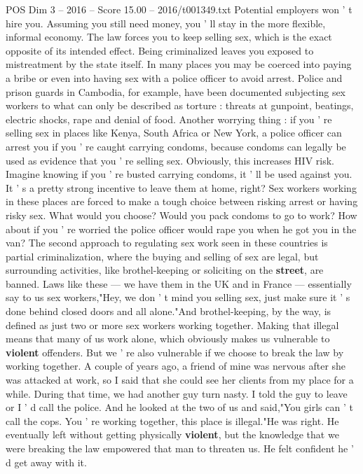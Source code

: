 \begin{textsample}{POS Dim 3 – 2016 – Score 15.00 – 2016/t001349.txt}
Potential employers won ' t hire you.
Assuming you still need money, you ' ll stay in the more flexible, informal economy.
The law forces you to keep selling sex, which is the exact opposite of its intended effect.
Being criminalized leaves you exposed to mistreatment by the state itself.
In many places you may be coerced into paying a bribe or even into having sex with a police officer to avoid arrest.
Police and prison guards in Cambodia, for example, have been documented subjecting sex workers to what can only be described as torture : threats at gunpoint, beatings, electric shocks, rape and denial of food.
Another worrying thing : if you ' re selling sex in places like Kenya, South Africa or New York, a police officer can arrest you if you ' re caught carrying condoms, because condoms can legally be used as evidence that you ' re selling sex.
Obviously, this increases HIV risk.
Imagine knowing if you ' re busted carrying condoms, it ' ll be used against you.
It ' s a pretty strong incentive to leave them at home, right?
Sex workers working in these places are forced to make a tough choice between risking arrest or having risky sex.
What would you choose?
Would you pack condoms to go to work?
How about if you ' re worried the police officer would rape you when he got you in the van?
The second approach to regulating sex work seen in these countries is partial criminalization, where the buying and selling of sex are legal, but surrounding activities, like brothel-keeping or soliciting on the \textbf{street}, are banned.
Laws like these — we have them in the UK and in France — essentially say to us sex workers,"Hey, we don ' t mind you selling sex, just make sure it ' s done behind closed doors and all alone."And brothel-keeping, by the way, is defined as just two or more sex workers working together.
Making that illegal means that many of us work alone, which obviously makes us vulnerable to \textbf{violent} offenders.
But we ' re also vulnerable if we choose to break the law by working together.
A couple of years ago, a friend of mine was nervous after she was attacked at work, so I said that she could see her clients from my place for a while.
During that time, we had another guy turn nasty.
I told the guy to leave or I ' d call the police.
And he looked at the two of us and said,"You girls can ' t call the cops.
You ' re working together, this place is illegal."He was right.
He eventually left without getting physically \textbf{violent}, but the knowledge that we were breaking the law empowered that man to threaten us.
He felt confident he ' d get away with it.

\end{textsample}
